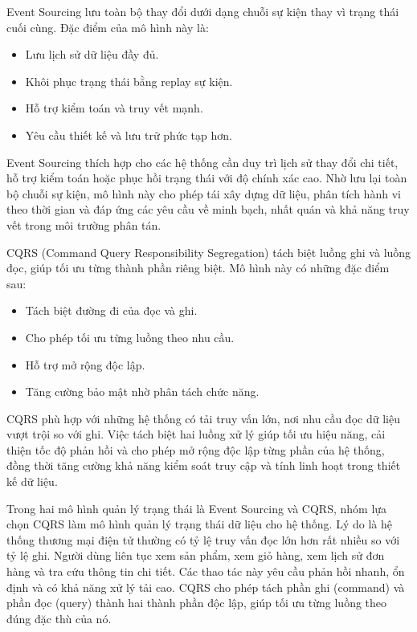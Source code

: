 Event Sourcing lưu toàn bộ thay đổi dưới dạng chuỗi sự kiện thay vì trạng thái cuối cùng. Đặc điểm của mô hình này là:
\begin{itemize}
    \item Lưu lịch sử dữ liệu đầy đủ\cite{c4-eda}.
    \item Khôi phục trạng thái bằng replay sự kiện.
    \item Hỗ trợ kiểm toán và truy vết mạnh\cite{c4-eda}.
    \item Yêu cầu thiết kế và lưu trữ phức tạp hơn\cite{c4-eda}.
\end{itemize}
Event Sourcing thích hợp cho các hệ thống cần duy trì lịch sử thay đổi chi tiết, hỗ trợ kiểm toán hoặc phục hồi trạng thái với độ chính xác cao. Nhờ lưu lại toàn bộ chuỗi sự kiện, mô hình này cho phép tái xây dựng dữ liệu, phân tích hành vi theo thời gian và đáp ứng các yêu cầu về minh bạch, nhất quán và khả năng truy vết trong môi trường phân tán.

CQRS (Command Query Responsibility Segregation) tách biệt luồng ghi và luồng đọc, giúp tối ưu từng thành phần riêng biệt. Mô hình này có những đặc điểm sau:
\begin{itemize}
    \item Tách biệt đường đi của đọc và ghi\cite{c4-eda}.
    \item Cho phép tối ưu từng luồng theo nhu cầu\cite{c4-eda}.
    \item Hỗ trợ mở rộng độc lập.
    \item Tăng cường bảo mật nhờ phân tách chức năng.
\end{itemize}
CQRS phù hợp với những hệ thống có tải truy vấn lớn, nơi nhu cầu đọc dữ liệu vượt trội so với ghi. Việc tách biệt hai luồng xử lý giúp tối ưu hiệu năng, cải thiện tốc độ phản hồi và cho phép mở rộng độc lập từng phần của hệ thống, đồng thời tăng cường khả năng kiểm soát truy cập và tính linh hoạt trong thiết kế dữ liệu.

Trong hai mô hình quản lý trạng thái là Event Sourcing và CQRS, nhóm lựa chọn CQRS làm mô hình quản lý trạng thái dữ liệu cho hệ thống. Lý do là hệ thống thương mại điện tử thường có tỷ lệ truy vấn đọc lớn hơn rất nhiều so với tỷ lệ ghi. Người dùng liên tục xem sản phẩm, xem giỏ hàng, xem lịch sử đơn hàng và tra cứu thông tin chi tiết. Các thao tác này yêu cầu phản hồi nhanh, ổn định và có khả năng xử lý tải cao. CQRS cho phép tách phần ghi (command) và phần đọc (query) thành hai thành phần độc lập, giúp tối ưu từng luồng theo đúng đặc thù của nó.

